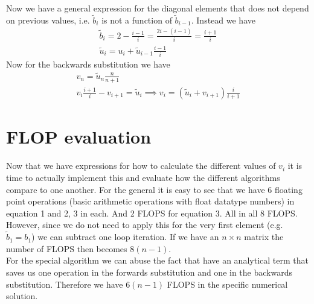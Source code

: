 \documentclass[10pt,a4paper]{article}
\begin{document}
    Now we have a general expression for the diagonal elements that does not depend on previous values, i.e. $\tilde{b}_i$ is not a function of $\tilde{b}_{i-1}$. Instead we have
    \begin{align}
        \tilde{b}_i = 2 - \frac{i-1}{i} = \frac{2i-(i-1)}{i} =\frac{i+1}{i}\\
        \tilde{u}_i = u_i + \tilde{u}_{i-1}\tfrac{i-1}{i}
    \end{align}
    Now for the backwards substitution we have
    \begin{align}
    v_n = \tilde{u}_n\frac{n}{n+1}\\
    v_{i}\frac{i+1}{i} - v_{i+1} = \tilde{u}_{i} \implies v_i =(\tilde{u}_i+v_{i+1})\frac{i}{i+1}
    \end{align}

    \newpage{}
    \section{FLOP evaluation}
    Now that we have expressions for how to calculate the different values of $v_i$ it is time to actually implement this and evaluate how the different algorithms compare to one another.
    For the general it is easy to see that we have 6 floating point operations (basic arithmetic operations with float datatype numbers) in equation 1 and 2, 3 in each. And 2 FLOPS for equation 3. All in all 8 FLOPS.
    However, since we do not need to apply this for the very first element (e.g. $\tilde{b}_1 = b_1$) we can subtract one loop iteration. If we have an $n\times n$ matrix the number of FLOPS then becomes $8(n-1)$.\\
    For the special algorithm we can abuse the fact that have an analytical term that saves us one operation in the forwards substitution and one in the backwards substitution. Therefore we have $6(n-1)$ FLOPS in the specific numerical solution.
\end{document}
